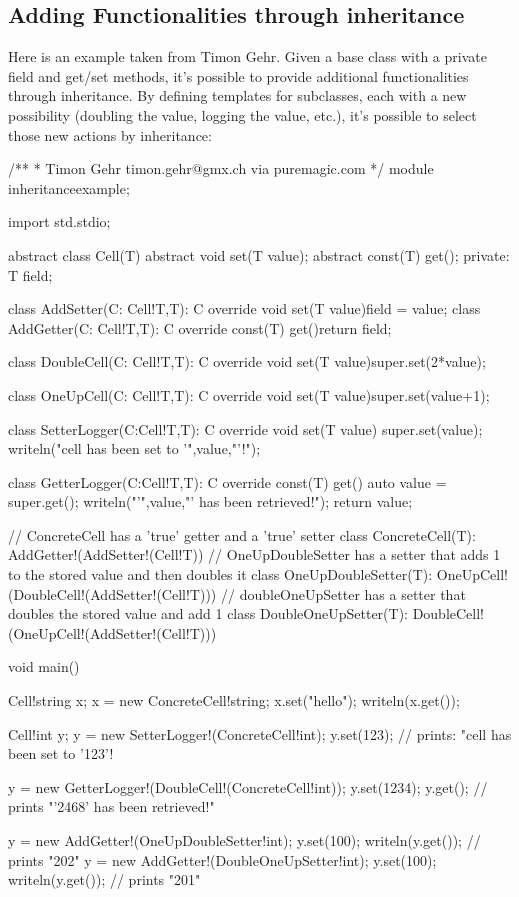 \subsection{Adding Functionalities through inheritance}
\label{functionalityinheritance}

Here is an example taken from Timon Gehr. Given a base class  with a private field and get/set methods, it's possible to provide additional functionalities through inheritance. By defining templates for  subclasses, each with a new possibility (doubling the value, logging the value, etc.), it's possible to select those new actions by inheritance:

\begin{dcode}
/**
 * Timon Gehr timon.gehr@gmx.ch via puremagic.com 
 */
module inheritanceexample;

import std.stdio;

abstract class Cell(T)
{
    abstract void set(T value);
    abstract const(T) get();
private:
    T field;
}

class AddSetter(C: Cell!T,T): C
{
    override void set(T value){field = value;}
}
class AddGetter(C: Cell!T,T): C
{
    override const(T) get(){return field;}
}

class DoubleCell(C: Cell!T,T): C
{
    override void set(T value){super.set(2*value);}
}

class OneUpCell(C: Cell!T,T): C
{
    override void set(T value){super.set(value+1);} 
}

class SetterLogger(C:Cell!T,T): C
{
    override void set(T value)
    {
        super.set(value);
        writeln("cell has been set to '",value,"'!");
    }
}

class GetterLogger(C:Cell!T,T): C
{
    override const(T) get()
    {
        auto value = super.get();
        writeln("'",value,"' has been retrieved!");
        return value;
    }
}

// ConcreteCell has a 'true' getter and a 'true' setter
class ConcreteCell(T): AddGetter!(AddSetter!(Cell!T)){}
// OneUpDoubleSetter has a setter that adds 1 to the stored value and then doubles it
class OneUpDoubleSetter(T): OneUpCell!(DoubleCell!(AddSetter!(Cell!T))){}
// doubleOneUpSetter has a setter that doubles the stored value and add 1
class DoubleOneUpSetter(T): DoubleCell!(OneUpCell!(AddSetter!(Cell!T))){}

void main()
{
    Cell!string x;
    x = new ConcreteCell!string;
    x.set("hello");
    writeln(x.get());
    
    Cell!int y;
    y = new SetterLogger!(ConcreteCell!int);
    y.set(123); // prints: "cell has been set to '123'!
       
    y = new GetterLogger!(DoubleCell!(ConcreteCell!int));
    y.set(1234);
    y.get(); // prints "'2468' has been retrieved!"

    y = new AddGetter!(OneUpDoubleSetter!int);
    y.set(100);
    writeln(y.get()); // prints "202"
    y = new AddGetter!(DoubleOneUpSetter!int);
    y.set(100);
    writeln(y.get()); // prints "201"
}
\end{dcode}
